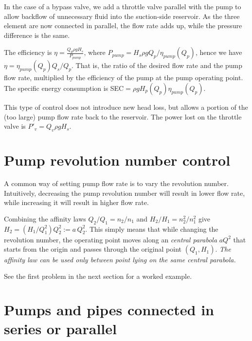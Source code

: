 In the case of a bypass valve, we add a throttle valve parallel with the pump to allow backflow of unnecessary fluid into the suction-side reservoir.  As the three element are now connected in parallel, the flow rate adds up, while the pressure difference is the same. 

The efficiency is $\eta=\frac{Q_d \rho g H_s}{P_{pump}}$, where $P_{pump}=H_s\rho g Q_p/\eta_{pump}(Q_p)$, hence we have $\eta=\eta_{pump}(Q_p)Q_s/Q_p$. That is, the ratio of the desired flow rate and the pump flow rate, multiplied by the efficiency of the pump at the pump operating point. The specific energy consumption is SEC$=\rho g H_p(Q_p)\eta_{pump}(Q_p)$.

This type of control does not introduce new head loss, but allows a portion of the (too large) pump flow rate back to the reservoir. The power lost on the throttle valve is $P'_v=Q_v \rho g H_s$.

\section{Pump revolution number control}

A common way of setting pump flow rate is to vary the revolution number. Intuitively, decreasing the pump revolution number will result in lower flow rate, while increasing it will result in higher flow rate.

Combining the affinity laws $Q_2/Q_1=n_2/n_1$ and $H_2/H_1=n_2^2/n_1^2$ give $H_2=\left( H_1/Q_1^2\right)Q_2^2:=a\,Q_2^2$. This simply means that while changing the revolution number, the operating point moves along an \emph{central parabola} $a Q^2$ that starts from the origin and passes through the original point $\left( Q_1,H_1\right)$. \emph{The affinity law can be used only between point lying on the same central parabola.}

See the first problem in the next section for a worked example.




\section{Pumps and pipes connected in series or parallel}

